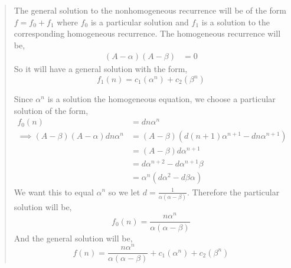 \documentclass[letter]{article}
\begin{document}
\begin{enumerate}
\begin{quote}
		    The general solution to the nonhomogeneous recurrence will be of the form $f=f_0+f_1$ where $f_0$ is a particular solution and $f_1$ is a solution to the corresponding homogeneous recurrence. The homogeneous recurrence will be, 
		    \begin{align*}
		        (A- \alpha)(A-\beta) &= 0
		    \end{align*}
		    So it will have a general solution with the form,
		    \[
		        f_1(n) = c_1(\alpha^n) + c_2(\beta^n)
		    \]
		    
		    Since $\alpha^n$ is a solution the homogeneous equation, we choose a particular solution of the form,
		    \begin{align*}
		        f_0(n) &= d n \alpha^n\\
		        \implies (A- \beta)(A -\alpha)  d n \alpha^n 
		        &= (A-\beta)(d (n+1)\alpha^{n+1} - dn\alpha^{n+1}) \\
		        &= (A-\beta)d\alpha^{n+1}\\
		        &= d\alpha^{n+2} - d\alpha^{n+1}\beta\\
		        &= \alpha^{n}(d\alpha^2 - d\beta\alpha)
		    \end{align*}
		    We want this to equal $\alpha^n$ so we let $d = \frac{1}{\alpha(\alpha-\beta)}$. Therefore the particular solution will be,
		    \[
		        f_0(n) = \frac{n\alpha^n}{\alpha(\alpha-\beta)}
		    \]
		    And the general solution will be,
		    \[
		        f(n) = \frac{n\alpha^n}{\alpha(\alpha-\beta)} + c_1(\alpha^n) + c_2(\beta^n)
		    \]
		    
		\end{quote}
		

\end{enumerate}
\end{document}
